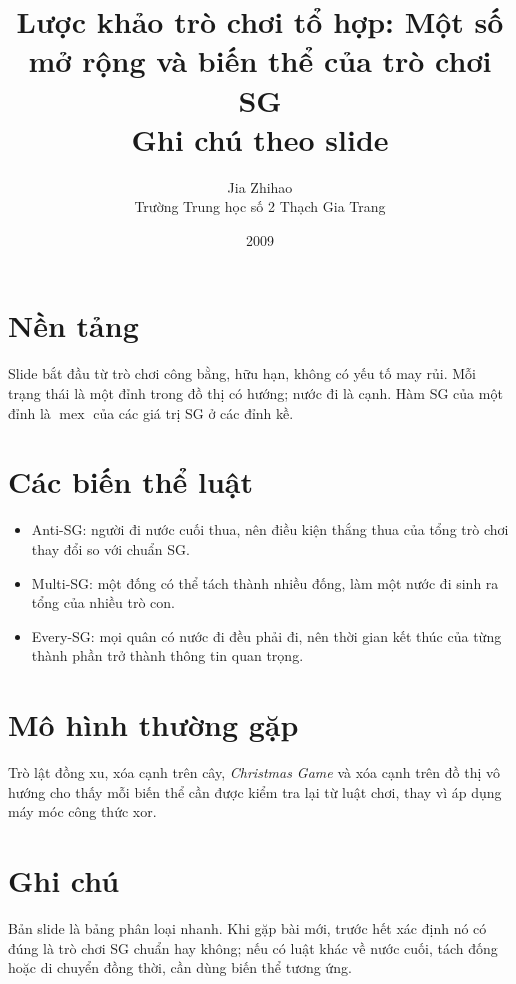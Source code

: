\documentclass[11pt]{article}
\title{Lược khảo trò chơi tổ hợp: Một số mở rộng và biến thể của trò chơi SG\\{\large Ghi chú theo slide}}
\author{Jia Zhihao\\Trường Trung học số 2 Thạch Gia Trang}
\date{2009}
\newcommand{\mex}{\operatorname{mex}}
\begin{document}
\maketitle


\section{Nền tảng}

Slide bắt đầu từ trò chơi công bằng, hữu hạn, không có yếu tố may rủi. Mỗi
trạng thái là một đỉnh trong đồ thị có hướng; nước đi là cạnh. Hàm SG của một
đỉnh là \(\mex\) của các giá trị SG ở các đỉnh kề.

\section{Các biến thể luật}

\begin{itemize}
  \item Anti-SG: người đi nước cuối thua, nên điều kiện thắng thua của tổng
  trò chơi thay đổi so với chuẩn SG.
  \item Multi-SG: một đống có thể tách thành nhiều đống, làm một nước đi sinh
  ra tổng của nhiều trò con.
  \item Every-SG: mọi quân có nước đi đều phải đi, nên thời gian kết thúc của
  từng thành phần trở thành thông tin quan trọng.
\end{itemize}

\section{Mô hình thường gặp}

Trò lật đồng xu, xóa cạnh trên cây, \textit{Christmas Game} và xóa cạnh trên
đồ thị vô hướng cho thấy mỗi biến thể cần được kiểm tra lại từ luật chơi, thay
vì áp dụng máy móc công thức xor.

\section{Ghi chú}

Bản slide là bảng phân loại nhanh. Khi gặp bài mới, trước hết xác định nó có
đúng là trò chơi SG chuẩn hay không; nếu có luật khác về nước cuối, tách đống
hoặc di chuyển đồng thời, cần dùng biến thể tương ứng.
\end{document}
